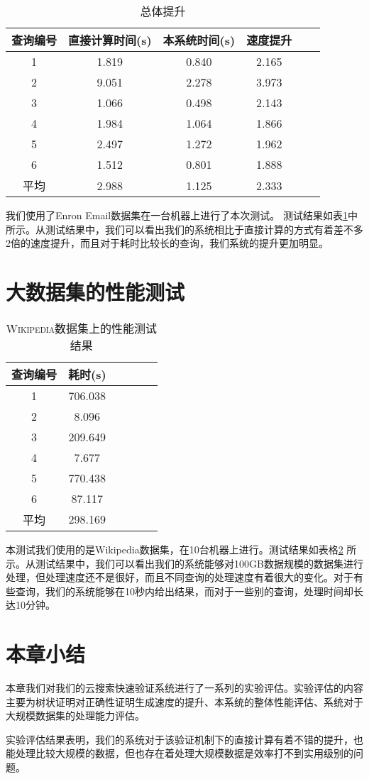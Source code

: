 \begin{table}[!tb]
    \centering
    \caption{\textsc{总体提升}}
    \begin{tabular}{cccccc}
        \toprule
        查询编号 & 直接计算时间(s) & 本系统时间(s) & 速度提升 \\
        \midrule
        1 & 1.819 & 0.840 & 2.165 \\
        2 & 9.051 & 2.278 & 3.973 \\
        3 & 1.066 & 0.498 & 2.143 \\
        4 & 1.984 & 1.064 & 1.866 \\
        5 & 2.497 & 1.272 & 1.962 \\
        6 & 1.512 & 0.801 & 1.888 \\
        \midrule
        平均 & 2.988 & 1.125 & 2.333 \\
        \bottomrule
    \end{tabular}
    \label{tab:overall_speedup}
\end{table}

我们使用了Enron Email数据集在一台机器上进行了本次测试。
测试结果如表\ref{tab:overall_speedup}中所示。从测试结果中，我们可以看出我们的系统相比于直接计算的方式有着差不多2倍的速度提升，而且对于耗时比较长的查询，我们系统的提升更加明显。

\section {大数据集的性能测试}
\begin{table}[!tb]
    \centering
    \caption{\textsc{Wikipedia数据集上的性能测试结果}}
    \begin{tabular}{cccccc}
        \toprule
        查询编号 & 耗时(s) \\
        \midrule
        1 & 706.038  \\
        2 & 8.096  \\
        3 & 209.649  \\
        4 & 7.677  \\
        5 & 770.438  \\
        6 & 87.117  \\
        \midrule
        平均 & 298.169  \\
        \bottomrule
    \end{tabular}
    \label{tab:wiki_speedup}
\end{table}
本测试我们使用的是Wikipedia数据集，在10台机器上进行。测试结果如表格\ref{tab:wiki_speedup} 所示。从测试结果中，我们可以看出我们的系统能够对100GB数据规模的数据集进行处理，但处理速度还不是很好，而且不同查询的处理速度有着很大的变化。对于有些查询，我们的系统能够在10秒内给出结果，而对于一些别的查询，处理时间却长达10分钟。
\section{本章小结}
本章我们对我们的云搜索快速验证系统进行了一系列的实验评估。实验评估的内容主要为树状证明对正确性证明生成速度的提升、本系统的整体性能评估、系统对于大规模数据集的处理能力评估。

实验评估结果表明，我们的系统对于该验证机制下的直接计算有着不错的提升，也能处理比较大规模的数据，但也存在着处理大规模数据是效率打不到实用级别的问题。
